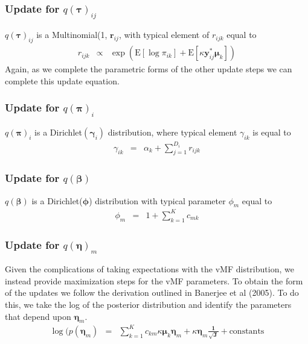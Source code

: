\documentclass{beamer}
\numberwithin{equation}{section}
\begin{document}
\begin{frame}
\frametitle{Update for $q(\boldsymbol{\tau})_{ij}$}
$q(\boldsymbol{\tau})_{ij}$ is a Multinomial(1, $\boldsymbol{r}_{ij}$, with typical element of $r_{ijk}$ equal to
\begin{eqnarray}
r_{ijk} & \propto & \exp\left(\text{E}[\log \pi_{ik} ]  + \text{E}[\kappa \boldsymbol{y}^{*}_{ij} \boldsymbol{\mu}_{k}] \right) \nonumber
\end{eqnarray}
Again, as we complete the parametric forms of the other update steps we can complete this update equation.
\end{frame}

\begin{frame}
\frametitle{Update for $q(\boldsymbol{\pi})_{i}$ }
$q(\boldsymbol{\pi})_{i}$ is a Dirichlet$(\boldsymbol{\gamma}_{i})$ distribution, where typical element $\gamma_{ik}$ is equal to
\begin{eqnarray}
\gamma_{ik} & = & \alpha_{k} + \sum_{j=1}^{D_{i}}r_{ijk}  \nonumber
\end{eqnarray}
\end{frame}

\begin{frame}
\frametitle{Update for $q(\boldsymbol{\beta})$}

$q(\boldsymbol{\beta})$ is a Dirichlet($\boldsymbol{\phi}$) distribution with typical parameter $\phi_{m}$ equal to
\begin{eqnarray}
\phi_{m} & = & 1 + \sum_{k=1}^{K} c_{mk} \nonumber
\end{eqnarray}

\end{frame}

\begin{frame}
\frametitle{Update for $q(\boldsymbol{\eta})_{m}$ }
Given the complications of taking expectations with the vMF distribution, we instead provide maximization steps for the vMF parameters.  To obtain the form of the updates we follow the derivation outlined in Banerjee et al (2005).  To do this, we take the log of the posterior distribution and identify the parameters that depend upon $\boldsymbol{\eta}_{m}$.
\begin{eqnarray}
\log(p(\boldsymbol{\eta}_{m} ) & = & \sum_{k=1}^{K} c_{km} \kappa \boldsymbol{\mu}_{k} \boldsymbol{\eta}_{m} + \kappa \boldsymbol{\eta}_{m}\boldsymbol{\frac{1}{\sqrt{J}}}  + \text{constants} \nonumber
\end{eqnarray}


\end{frame}
\end{document}
